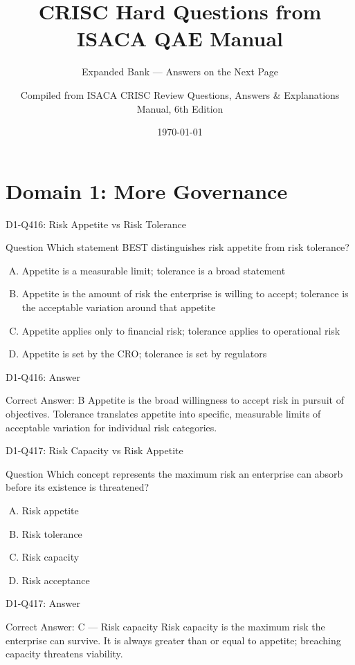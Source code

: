 \documentclass{beamer}
\title{CRISC Hard Questions from ISACA QAE Manual}
\subtitle{Expanded Bank --- Answers on the Next Page}
\author{Compiled from ISACA CRISC Review Questions, Answers \& Explanations Manual, 6th Edition}
\date{\today}
\begin{document}
\section{Domain 1: More Governance}

\begin{frame}{D1-Q416: Risk Appetite vs Risk Tolerance}
	\begin{block}{Question}
		Which statement BEST distinguishes risk appetite from risk tolerance?
	\end{block}
	\begin{enumerate}[(A)]
		\item Appetite is a measurable limit; tolerance is a broad statement
		\item Appetite is the amount of risk the enterprise is willing to accept; tolerance is the acceptable variation around that appetite
		\item Appetite applies only to financial risk; tolerance applies to operational risk
		\item Appetite is set by the CRO; tolerance is set by regulators
	\end{enumerate}
\end{frame}
\begin{frame}{D1-Q416: Answer}
	\begin{block}{Correct Answer: B}
		Appetite is the broad willingness to accept risk in pursuit of objectives. Tolerance translates appetite into specific, measurable limits of acceptable variation for individual risk categories.
	\end{block}
\end{frame}

\begin{frame}{D1-Q417: Risk Capacity vs Risk Appetite}
	\begin{block}{Question}
		Which concept represents the maximum risk an enterprise can absorb before its existence is threatened?
	\end{block}
	\begin{enumerate}[(A)]
		\item Risk appetite
		\item Risk tolerance
		\item Risk capacity
		\item Risk acceptance
	\end{enumerate}
\end{frame}
\begin{frame}{D1-Q417: Answer}
	\begin{block}{Correct Answer: C --- Risk capacity}
		Risk capacity is the maximum risk the enterprise can survive. It is always greater than or equal to appetite; breaching capacity threatens viability.
	\end{block}
\end{frame}
\end{document}
